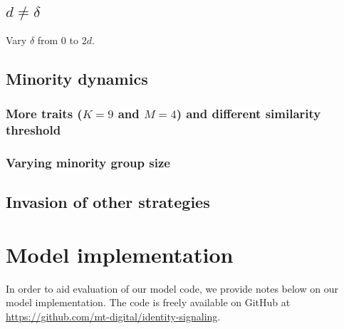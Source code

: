 \documentclass[11pt,letterpaper]{article}
\begin{document}
\subsection{$d \neq \delta$}

Vary $\delta$ from 0 to $2d$.

\subsection{Minority dynamics} 

\subsubsection{More traits ($K=9$ and $M=4$) and different similarity threshold}

\subsubsection{Varying minority group size}

\subsection{Invasion of other strategies}


\section{Model implementation}

In order to aid evaluation of our model code, we provide notes below on 
our model implementation. The code is freely available on GitHub at
\url{https://github.com/mt-digital/identity-signaling}.
\end{document}
